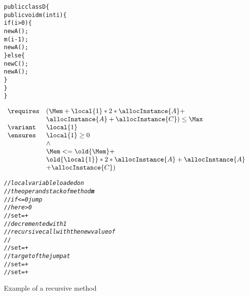\begin{figure}[!hbp]
\begin{alltt}
public class D \{
  public void m( int i) \{
    if (i > 0) \{
      new A();
      m(i - 1);
      new A();
    \} else \{
      new C();
      new A();
   \}
  \}
\}
\end{alltt}

$$
\begin{array}{ll}
 \requires & ( \Mem + \local{1}*2*\allocInstance{A} + \\
           &  \allocInstance{A} + \allocInstance{C}) \le \Max \\
 \variant  & \local{1} \\
 \ensures  & \local{1} \ge 0 \\
           & \wedge \\
           & \Mem <= \old{\Mem} +  \\
	   & \old{\local{1}}*2*\allocInstance{A} + \allocInstance{A}\\
           &  +  \allocInstance{C})
\end{array}$$

\begin{alltt}
//\small{\textit{local variable loaded on} }
//\small{\textit{the operand stack of method \textbf{m}}}
//\small{ \textit{ if  <= 0 jump}}
 //\small{ \textit{ here  > 0  } }
//set \Mem = \Mem +  
//\small{\textit{ decremented with 1}}
//\small{ \textit{ recursive call with the new value of }}
//
//set \Mem = \Mem +  
//\small{\textit{target of the jump at }}
//set \Mem = \Mem +  
//set \Mem = \Mem +  
\end{alltt}

\caption{\sc Example of a recursive method}
 \label{recMeth}
\end{figure}

